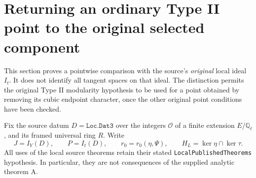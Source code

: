 \section{Returning an ordinary Type II point to the original selected component}
\label{sec:cubic-selected-component}

This section proves a pointwise comparison with the source's
\emph{original} local ideal $I_t$.  It does not identify all
tangent spaces on that ideal.  The distinction permits the
original Type II modularity hypothesis to be used for a point
obtained by removing its cubic endpoint character, once the
other original point conditions have been checked.

Fix the source datum $D=\texttt{Loc.Dat3}$ over the integers
$\mathcal O$ of a finite extension $E/\mathbb Q_\ell$,
and its framed universal ring $R$.  Write
\[
 J=I_Y(D),\qquad P=I_t(D),\qquad
 r_0=r_0(\eta,\Psi),\qquad H_L=\ker\eta\cap\ker\tau.
                                                        \tag{G48.1}
\]
All uses of the local source theorems retain their stated
\texttt{LocalPublishedTheorems} hypothesis.  In particular,
they are not consequences of the supplied analytic theorem A.

